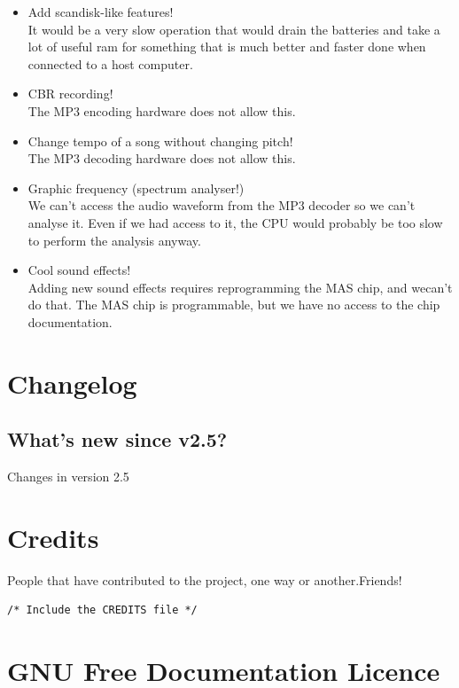 {\begin{itemize}
\item Add scandisk{}-like features!\\
It would be a very slow operation that would drain the batteries and take a lot of useful ram for something that is much better and faster done when connected to a host computer.
\item CBR recording!\\
The MP3 encoding hardware does not allow this.
\item Change tempo of a song without changing pitch!\\
 The MP3 decoding hardware does not allow this.
\item Graphic frequency (spectrum analyser!)\\
We can't access the audio waveform from the MP3 decoder so we can't analyse it. Even if we had access to it, the CPU would probably be too slow to perform the analysis anyway.
\item Cool sound effects!\\
 Adding new sound effects requires reprogramming the MAS chip, and wecan't do that. The MAS chip is programmable, but we have no access to the chip documentation.
\end{itemize}
}


\chapter{Changelog}
\section{What's new since v2.5?}
Changes in version 2.5

\chapter{Credits}
People that have contributed to the project, one way or another.Friends!
\begin{verbatim}
/* Include the CREDITS file */
\end{verbatim}

\chapter{GNU Free Documentation Licence}

